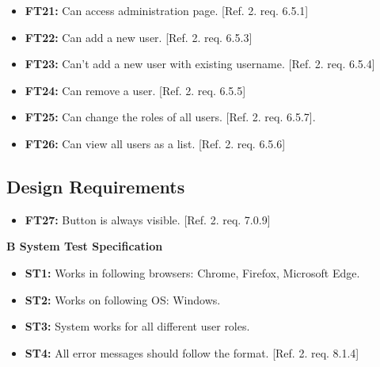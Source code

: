 \documentclass{article}
\begin{document}
			\begin{itemize}
			
			\item \textbf{FT21:} Can access administration page. [Ref. 2. req. 6.5.1]			
			
  			\item \textbf{FT22:} Can add a new user. [Ref. 2. req. 6.5.3]
  			
  			\item \textbf{FT23:} Can't add a new user with existing username. [Ref. 2. req. 6.5.4]

  			\item \textbf{FT24:} Can remove a user. [Ref. 2. req. 6.5.5]
  			
  			\item \textbf{FT25:} Can change the roles of all users. [Ref. 2. req. 6.5.7].
  			
  			\item \textbf{FT26:} Can view all users as a list. [Ref. 2. req. 6.5.6]

		\end{itemize}
		
		\subsection{Design Requirements}
		
		\begin{itemize}
  			
  			\item \textbf{FT27:} Button is always visible. [Ref. 2. req. 7.0.9]

		\end{itemize}
		
		\newpage
		\begin{flushleft}
		{\large \textbf{B System Test Specification}}
		\end{flushleft}
		
		
		
		\begin{itemize}
		
  			\item \textbf{ST1:} Works in following browsers: Chrome, Firefox, Microsoft Edge.  
  			
  			\item \textbf{ST2:} Works on following OS: Windows.	 			
  			
  			\item \textbf{ST3:} System works for all different user roles. 
  			
  			\item \textbf{ST4:} All error messages should follow the format. [Ref. 2. req. 8.1.4]

  			
		\end{itemize}
		
\end{document}
